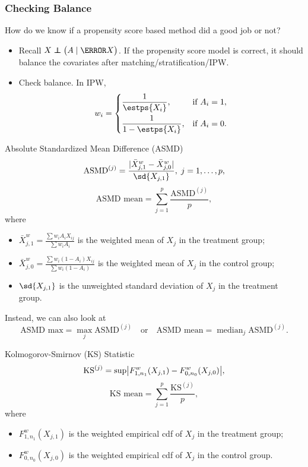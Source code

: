 \documentclass[oneside]{book}\usepackage[]{graphicx}\usepackage[svgnames]{xcolor}
\newcommand\indep{\protect\mathpalette{\protect\independenT}{\perp}}
\def\independenT#1#2{\mathrel{\rlap{$#1#2$}\mkern2mu{#1#2}}}
\newcommand{\ASMD}{\text{ASMD}}%
\DeclarePairedDelimiter\abs{\lvert}{\rvert}
\begin{document}
\subsubsection{Checking Balance}
How do we know if a propensity score based method did a good
job or not?
\begin{itemize}
      \item Recall $ X\indep \bigl(A\mid \ps{X}\bigr) $. If the propensity score model is correct, it should balance the
            covariates after matching/stratification/IPW.
      \item Check balance. In IPW,
            \[ w_i=\begin{dcases}
                        \frac{1}{\estps{X_i}},   & \text{if $A_i=1$}, \\
                        \frac{1}{1-\estps{X_i}}, & \text{if $A_i=0$}. \\
                  \end{dcases} \]
\end{itemize}
\begin{Regular}{Absolute Standardized Mean Difference (ASMD)}
      \[ \ASMD^{(j)}=\frac{\abs{\bar{X}_{j,1}^w-\bar{X}_{j,0}^w}}{\sd{X_{j,1}}},\; j=1,\ldots,p, \]
      \[ \ASMD\text{ mean}=\sum_{j=1}^{p}\frac{\ASMD^{(j)}}{p}, \]
      where
      \begin{itemize}
            \item $ \bar{X}_{j,1}^w=\frac{\sum w_i A_i X_{ij}}{\sum w_i A_i} $ is the weighted mean of $ X_j $ in the treatment group;
            \item $ \bar{X}_{j,0}^w=\frac{\sum w_i(1-A_i)X_{ij}}{\sum w_i(1-A_i)} $ is the weighted mean of $ X_j $ in the control group;
            \item $ \sd{X_{j,1}} $ is the unweighted standard deviation of $ X_j $ in the treatment group.
      \end{itemize}
      Instead, we can also look at
      \[ \ASMD\text{ max}=\max_j \ASMD^{(j)}\quad\text{or}\quad\ASMD\text{ mean}=\mathop{\text{median}}_j\ASMD^{(j)}.  \]
\end{Regular}
\begin{Regular}{Kolmogorov-Smirnov (KS) Statistic}
      \[ \text{KS}^{(j)}=\sup\abs*{F_{1,n_1}^w(X_{j,1})-F_{0,n_0}^w(X_{j,0})}, \]
      \[ \text{KS mean}=\sum_{j=1}^{p}\frac{\text{KS}^{(j)}}{p}, \]
      where
      \begin{itemize}
            \item $ F_{1,n_1}^w(X_{j,1}) $ is the weighted empirical cdf of $ X_j $ in the treatment group;
            \item $ F_{0,n_0}^w(X_{j,0}) $ is the weighted empirical cdf of $ X_j $ in the control group.
      \end{itemize}
\end{Regular}
\end{document}
